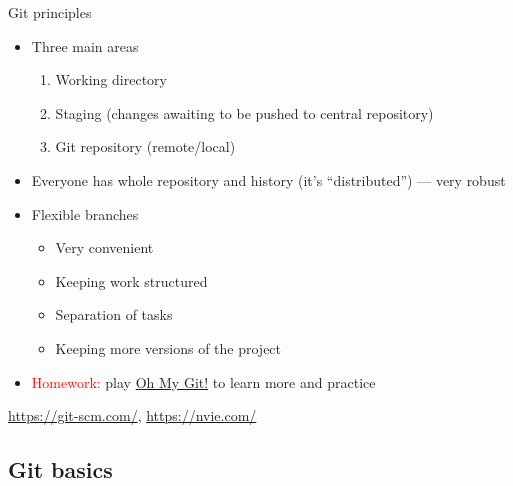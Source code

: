 \documentclass[compress, xelatex, 11pt, xcolor=svgnames, aspectratio=169,
	hyperref={
		bookmarks=true,
		unicode=true,
		colorlinks=true,
		pdftitle={Linux, command line and MetaCentrum},
		plainpages=false,
		pdfauthor={Vojtech Zeisek},
		pdfsubject={Course about use of Linux command line, writing shell scripts and using MetaCentrum of CESNET},
		pdfcreator={XeLaTeX},
		pdfkeywords={Linux, GNU, BASH, shell, command line, MetaCentrum},
		linkcolor=DarkRed, %
		anchorcolor=DarkBlue, %
		citecolor=Indigo, %
		filecolor=NavyBlue, %
		menucolor=DarkMagenta, %
		urlcolor=DarkBlue, %
		},
	url={hyphens, lowtilde} %
	]{beamer}
\renewcommand{\texttt}[1]{\colorbox{Beige}{{\ttfamily #1}}}
\renewcommand{\alert}[1]{\textcolor{red}{#1}}
\begin{document}
\begin{frame}[fragile]{Git principles}
	\begin{multicols}{2}
		\begin{itemize}
			\item Three main areas
			\begin{enumerate}
				\item Working directory
				\item Staging (changes awaiting to be pushed to central repository)
				\item Git repository (remote/local)
			\end{enumerate}
			\item Everyone has whole repository and history (it's \enquote{distributed}) --- very robust
			\item Flexible branches
			\begin{itemize}
				\item Very convenient
				\item Keeping work structured
				\item Separation of tasks
				\item Keeping more versions of the project
			\end{itemize}
			\item \alert{Homework:} play \href{https://ohmygit.org/}{Oh My Git!} to learn more and practice
		\end{itemize}
		\begin{center}
			\texttt{[image: git.png]}
		\end{center}
		\begin{flushright}
			\begin{footnotesize}
				\href{https://git-scm.com/book/en/v2/Getting-Started-What-is-Git\%3F}{https://git-scm.com/}, \href{https://nvie.com/posts/a-successful-git-branching-model/}{https://nvie.com/}
			\end{footnotesize}
		\end{flushright}
	\end{multicols}
\end{frame}

\subsection{Git basics} %
\end{document}
